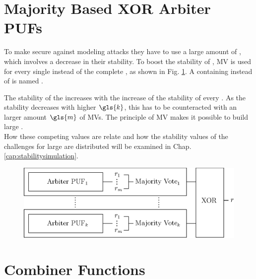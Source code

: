 
\section{Majority Based XOR Arbiter PUFs}
\label{sec:majorityxorarbiter}

To make \xpufs secure against modeling attacks they have to use a large amount of \apufs, which involves a decrease in their stability.
To boost the stability of \xpufs, \ac{MV} is used for every single \apuf instead of the complete \xpuf, as shown in Fig. \ref{fig:majorityxorarbiter}.
A \xpuf containing \mpufs instead of \apufs is named \mxpuf.

The stability of the \xpuf increases with the increase of the stability of every \mpuf.
As the stability decreases with higher $\gls{k}$, this has to be counteracted with an larger amount $\gls{m}$ of \acp{MV}.
The principle of \ac{MV} makes it possible to build large \mxpufs.\\
How these competing values are relate and how the stability values of the challenges for large \mxpufs are distributed will be examined in Chap. \ref{cap:stabilitysimulation}.

\begin{figure}[ht]
\centering
\includegraphics[width=1.00\textwidth]{images/majority_xor_arbiter_v2.eps}
\caption[Majority \acs{XOR} \apuf]{\mxpuf}
\label{fig:majorityxorarbiter}
\end{figure}


\section{Combiner Functions}
\label{sec:combinerfunctions}

